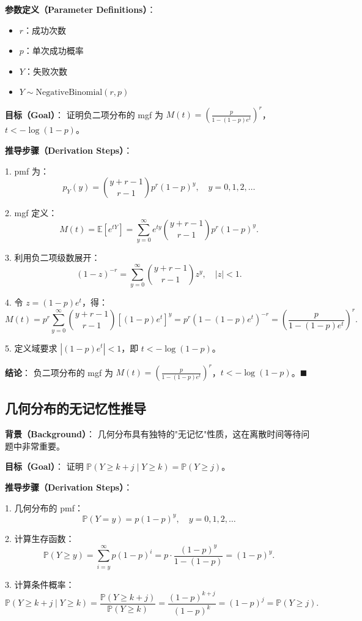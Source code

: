 \textbf{参数定义（Parameter Definitions）}：
\begin{itemize}
\item $r$：成功次数
\item $p$：单次成功概率
\item $Y$：失败次数
\item $Y \sim \text{NegativeBinomial}(r, p)$
\end{itemize}

\textbf{目标（Goal）}：
证明负二项分布的 mgf 为 $M(t) = \left(\frac{p}{1-(1-p)e^t}\right)^r$，$t < -\log(1-p)$。

\textbf{推导步骤（Derivation Steps）}：

1. pmf 为：
\[
p_Y(y) = \binom{y+r-1}{r-1} p^r (1-p)^y, \quad y = 0, 1, 2, \ldots
\]

2. mgf 定义：
\[
M(t) = \mathbb{E}[e^{tY}] = \sum_{y=0}^\infty e^{ty} \binom{y+r-1}{r-1} p^r (1-p)^y.
\]

3. 利用负二项级数展开：
\[
(1 - z)^{-r} = \sum_{y=0}^\infty \binom{y+r-1}{r-1} z^y, \quad |z| < 1.
\]

4. 令 $z = (1-p)e^t$，得：
\[
M(t) = p^r \sum_{y=0}^\infty \binom{y+r-1}{r-1} [(1-p)e^t]^y = p^r (1 - (1-p)e^t)^{-r} = \left(\frac{p}{1-(1-p)e^t}\right)^r.
\]

5. 定义域要求 $| (1-p)e^t | < 1$，即 $t < -\log(1-p)$。

\textbf{结论}：
负二项分布的 mgf 为 $M(t) = \left(\frac{p}{1-(1-p)e^t}\right)^r$，$t < -\log(1-p)$。$\blacksquare$

\subsection{几何分布的无记忆性推导}\label{sec:geometric-memoryless}

\textbf{背景（Background）}：
几何分布具有独特的"无记忆"性质，这在离散时间等待问题中非常重要。

\textbf{目标（Goal）}：
证明 $\mathbb{P}(Y \geq k+j \mid Y \geq k) = \mathbb{P}(Y \geq j)$。

\textbf{推导步骤（Derivation Steps）}：

1. 几何分布的 pmf：
\[
\mathbb{P}(Y = y) = p(1-p)^y, \quad y = 0, 1, 2, \ldots
\]

2. 计算生存函数：
\[
\mathbb{P}(Y \geq y) = \sum_{i=y}^\infty p(1-p)^i = p \cdot \frac{(1-p)^y}{1-(1-p)} = (1-p)^y.
\]

3. 计算条件概率：
\[
\mathbb{P}(Y \geq k+j \mid Y \geq k) = \frac{\mathbb{P}(Y \geq k+j)}{\mathbb{P}(Y \geq k)} = \frac{(1-p)^{k+j}}{(1-p)^k} = (1-p)^j = \mathbb{P}(Y \geq j).
\]

